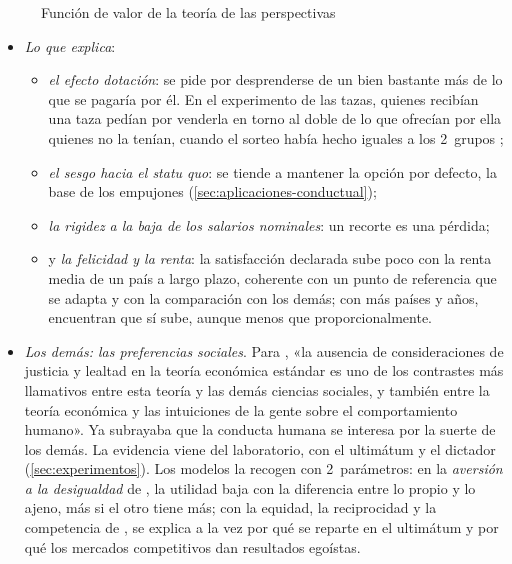 \documentclass[11pt]{article}
\begin{document}
\begin{figure}[H]
\centering
\caption{Función de valor de la teoría de las perspectivas}\label{fig:funcion-valor}
\end{figure}

\begin{itemize}
\item \emph{Lo que explica}:
  \begin{itemize}
  \item \emph{el efecto dotación}: se pide por desprenderse de un bien bastante más de lo que se pagaría por él. En el experimento de las tazas, quienes recibían una taza pedían por venderla en torno al doble de lo que ofrecían por ella quienes no la tenían, cuando el sorteo había hecho iguales a los 2~grupos\nocite{KahnemanKnetschThaler1990Endowment} ;
  \item \emph{el sesgo hacia el statu quo}: se tiende a mantener la opción por defecto\nocite{SamuelsonZeckhauser1988Status}, la base de los empujones (\ref{sec:aplicaciones-conductual});
  \item \emph{la rigidez a la baja de los salarios nominales}: un recorte es una pérdida\nocite{KahnemanKnetschThaler1986Fairness};
  \item y \emph{la felicidad y la renta}: la satisfacción declarada sube poco con la renta media de un país a largo plazo\nocite{Easterlin1974Does}, coherente con un punto de referencia que se adapta y con la comparación con los demás; con más países y años, \textcite{StevensonWolfers2008Economic} encuentran que sí sube, aunque menos que proporcionalmente.
  \end{itemize}
\item \emph{Los demás: las preferencias sociales}. Para \textcite[S285]{KahnemanKnetschThaler1986Assumptions}, «la ausencia de consideraciones de justicia y lealtad en la teoría económica estándar es uno de los contrastes más llamativos entre esta teoría y las demás ciencias sociales, y también entre la teoría económica y las intuiciones de la gente sobre el comportamiento humano». Ya \textcite{Smith1759Theory} subrayaba que la conducta humana se interesa por la suerte de los demás. La evidencia viene del laboratorio, con el ultimátum y el dictador (\ref{sec:experimentos}). Los modelos la recogen con 2~parámetros: en la \emph{aversión a la desigualdad} de \textcite{FehrSchmidt1999Theory}, la utilidad baja con la diferencia entre lo propio y lo ajeno, más si el otro tiene más; con la equidad, la reciprocidad y la competencia de \textcite{BoltonOckenfels2000ERC}, se explica a la vez por qué se reparte en el ultimátum y por qué los mercados competitivos dan resultados egoístas.

\end{itemize}
\end{document}
